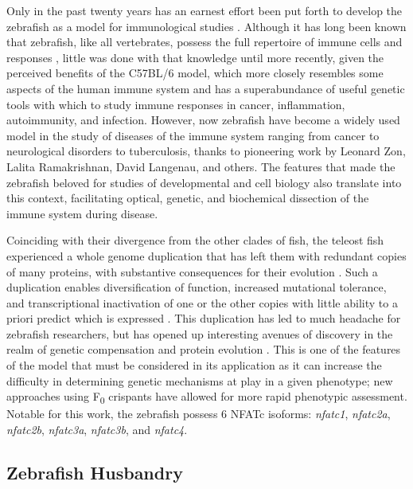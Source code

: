 Only in the past twenty years has an earnest effort been put forth to develop the zebrafish as a model for immunological studies \citep{Hsu2004, Davis2002, Langenau2003}. Although it has long been known that zebrafish, like all vertebrates, possess the full repertoire of immune cells and responses \citep{LugoVillarino2010}, little was done with that knowledge until more recently, given the perceived benefits of the C57BL/6 model, which more closely resembles some aspects of the human immune system and has a superabundance of useful genetic tools with which to study immune responses in cancer, inflammation, autoimmunity, and infection. However, now zebrafish have become a widely used model in the study of diseases of the immune system ranging from cancer to neurological disorders to tuberculosis, thanks to pioneering work by Leonard Zon, Lalita Ramakrishnan, David Langenau, and others. The features that made the zebrafish beloved for studies of developmental and cell biology also translate into this context, facilitating optical, genetic, and biochemical dissection of the immune system during disease.

Coinciding with their divergence from the other clades of fish, the teleost fish experienced a whole genome duplication that has left them with redundant copies of many proteins, with substantive consequences for their evolution \citep{Amores2011, Glasauer2014, Howe2013}. Such a duplication enables diversification of function, increased mutational tolerance, and transcriptional inactivation of one or the other copies with little ability to a priori predict which is expressed \citep{Opazo2013, Voldoire2017}. This duplication has led to much headache for zebrafish researchers, but has opened up interesting avenues of discovery in the realm of genetic compensation and protein evolution \citep{Rossi2015, ElBrolosy2017, ElBrolosy2019, Kontarakis2017, Sztal2020, Stainier2015, Moleri2011, Boudinot2011, Stainier2017}. This is one of the features of the model that must be considered in its application as it can increase the difficulty in determining genetic mechanisms at play in a given phenotype; new approaches using F\textsubscript{0} crispants have allowed for more rapid phenotypic assessment. Notable for this work, the zebrafish possess 6 NFATc isoforms: \textit{nfatc1}, \textit{nfatc2a}, \textit{nfatc2b}, \textit{nfatc3a}, \textit{nfatc3b}, and \textit{nfatc4}.

\subsection{Zebrafish Husbandry}

